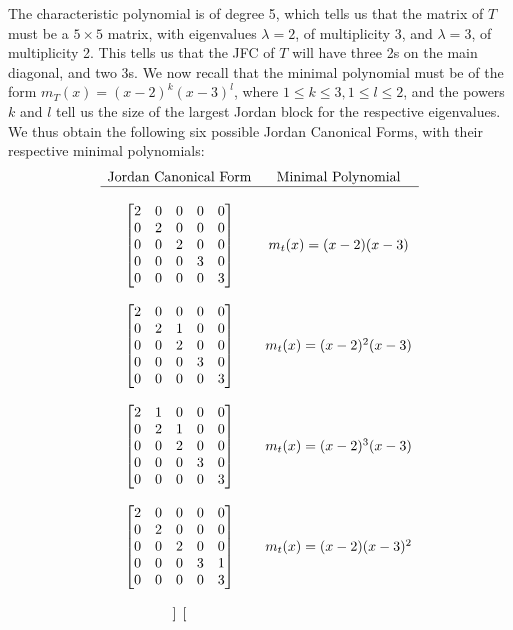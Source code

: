 \documentclass[letterpaper,12pt]{article}
\begin{document}
\begin{enumerate}
The characteristic polynomial is of degree 5, which tells us that the matrix of $T$ must be a $5\times 5$ matrix, with eigenvalues $\lambda=2$, of multiplicity 3, and $\lambda=3$, of multiplicity 2. This tells us that the JFC of $T$ will have three 2s on the main diagonal, and two 3s. We now recall that the minimal polynomial must be of the form $m_T(x)=(x-2)^k(x-3)^l$, where $1\leq k\leq 3, 1\leq l\leq 2$, and the powers $k$ and $l$ tell us the size of the largest Jordan block for the respective eigenvalues. We thus obtain the following six possible Jordan Canonical Forms, with their respective minimal polynomials:
\[
 \begin{array}{cc}
  \text{Jordan Canonical Form}&\text{Minimal Polynomial}\\
\hline
\\
\begin{bmatrix}
 2&0&0&0&0\\
 0&2&0&0&0\\
 0&0&2&0&0\\
 0&0&0&3&0\\
 0&0&0&0&3
\end{bmatrix}& m_t(x) = (x-2)(x-3)\\
\\
\begin{bmatrix}
 2&0&0&0&0\\
 0&2&1&0&0\\
 0&0&2&0&0\\
 0&0&0&3&0\\
 0&0&0&0&3
\end{bmatrix}& m_t(x) = (x-2)^2(x-3)\\
\\
\begin{bmatrix}
 2&1&0&0&0\\
 0&2&1&0&0\\
 0&0&2&0&0\\
 0&0&0&3&0\\
 0&0&0&0&3
\end{bmatrix}& m_t(x) = (x-2)^3(x-3)\\
\\
\begin{bmatrix}
 2&0&0&0&0\\
 0&2&0&0&0\\
 0&0&2&0&0\\
 0&0&0&3&1\\
 0&0&0&0&3
\end{bmatrix}& m_t(x) = (x-2)(x-3)^2\\
\\
\begin{bmatrix}

\end{bmatrix}
\end{array}\]
\end{enumerate}
\end{document}
